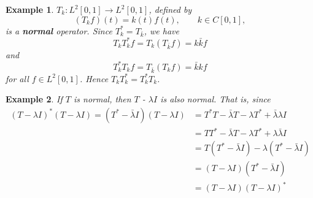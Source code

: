 \documentclass{report}
\newtheorem{exm}{Example}
\begin{document}
\begin{exm}
    $T_k:L^2[0,1]\to L^2[0,1]$, defined by
    \[
    (T_kf)(t)=k(t)f(t), \qquad k\in C[0,1],
    \]
    is a \textbf{normal} operator. 
    Since $T_k^*=T_{\bar{k}}$, we have
    \[
    T_kT_k^*f=T_k(T_{\bar{k}}f)=k\bar{k}f
    \]
    and
    \[
    T_k^*T_kf=T_{\bar{k}}(T_kf)=\bar{k}kf
    \]
    for all $f\in L^2[0,1]$. Hence $T_kT_k^*=T_k^*T_k$.
\end{exm}

\begin{exm}
If $T$ is normal, then $T$ - $\lambda I$ is also normal. That is, since
$$
\begin{aligned}
  (T-\lambda I)^{*}(T-\lambda I) = (T^{*}-\bar{\lambda}I)(T-\lambda I) &= T^{*}T-\bar{\lambda}T-\lambda T^{*}+\bar{\lambda}\lambda I \\
                                                                       &= TT^{*}-\bar{\lambda}T-\lambda T^{*}+\lambda\bar{\lambda}I \\
                                                                       &= T(T^{*}-\bar{\lambda}I) - \lambda (T^{*}-\bar{\lambda}I) \\
                                                                       &= (T-\lambda I)(T^{*}-\bar{\lambda}I) \\
                                                                       &= (T-\lambda I)(T-\lambda I)^{*}
\end{aligned}
$$
\end{exm}
\end{document}
